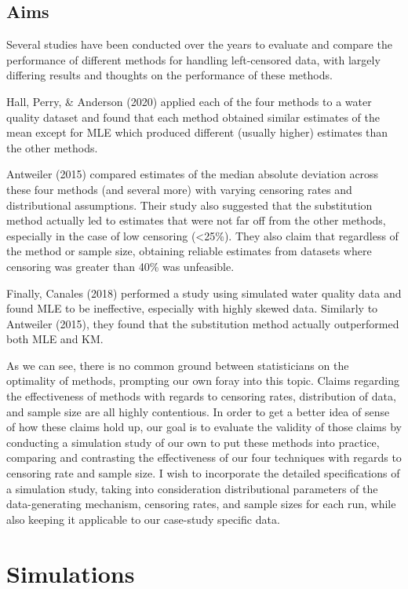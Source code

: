 \documentclass[12pt, twoside]{amherstthesis}
\begin{document}
\hypertarget{aims}{%
\section{Aims}\label{aims}}

Several studies have been conducted over the years to evaluate and compare the performance of different methods for handling left-censored data, with largely differing results and thoughts on the performance of these methods.

Hall, Perry, \& Anderson (2020) applied each of the four methods to a water quality dataset and found that each method obtained similar estimates of the mean except for MLE which produced different (usually higher) estimates than the other methods.

Antweiler (2015) compared estimates of the median absolute deviation across these four methods (and several more) with varying censoring rates and distributional assumptions. Their study also suggested that the substitution method actually led to estimates that were not far off from the other methods, especially in the case of low censoring (\textless25\%). They also claim that regardless of the method or sample size, obtaining reliable estimates from datasets where censoring was greater than 40\% was unfeasible.

Finally, Canales (2018) performed a study using simulated water quality data and found MLE to be ineffective, especially with highly skewed data. Similarly to Antweiler (2015), they found that the substitution method actually outperformed both MLE and KM.

As we can see, there is no common ground between statisticians on the optimality of methods, prompting our own foray into this topic. Claims regarding the effectiveness of methods with regards to censoring rates, distribution of data, and sample size are all highly contentious. In order to get a better idea of sense of how these claims hold up, our goal is to evaluate the validity of those claims by conducting a simulation study of our own to put these methods into practice, comparing and contrasting the effectiveness of our four techniques with regards to censoring rate and sample size. I wish to incorporate the detailed specifications of a simulation study, taking into consideration distributional parameters of the data-generating mechanism, censoring rates, and sample sizes for each run, while also keeping it applicable to our case-study specific data.

\hypertarget{simulations}{%
\chapter{Simulations}\label{simulations}}
\end{document}
